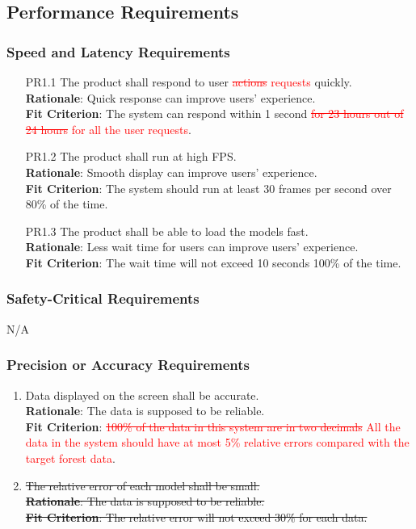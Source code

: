 \documentclass{article}
\begin{document}
\subsection{Performance Requirements}
\subsubsection{Speed and Latency Requirements}
\begin{enumerate}
    \item[PR1.1] The product shall respond to user \textcolor{red}{\st{actions} requests} quickly.\\
    \textbf{Rationale}: Quick response can improve users' experience.\\
    \textbf{Fit Criterion}: The system can respond within 1 second \textcolor{red}{\st{for 23 hours out
     of 24 hours} for all the user requests}.
    
    \item[PR1.2] The product shall run at high FPS.\\
    \textbf{Rationale}: Smooth display can improve users' experience.\\
    \textbf{Fit Criterion}: The system should run at least 30 frames per second over 80\% of the time.
    
    \item[PR1.3] The product shall be able to load the models fast.\\
    \textbf{Rationale}: Less wait time for users can improve users' experience.\\
    \textbf{Fit Criterion}: The wait time will not exceed 10 seconds 100\% of the time.
\end{enumerate}
\subsubsection{Safety-Critical Requirements}
N/A
\subsubsection{Precision or Accuracy Requirements}
\begin{enumerate}[PR3.1]
    \item Data displayed on the screen shall be accurate.\\
    \textbf{Rationale}: The data is supposed to be reliable.\\
    \textbf{Fit Criterion}: \textcolor{red}{\st{100\% of the data in this system are in two decimals}
    All the data in the system should have at most 5\% relative errors compared with the target
    forest data}.\\
 
   
    \item \st{The relative error of each model shall be small. \\
    \textbf{Rationale}: The data is supposed to be reliable.\\
    \textbf{Fit Criterion}: The relative error will not exceed 30\% for each data.}\\
    
\end{enumerate}
\end{document}
